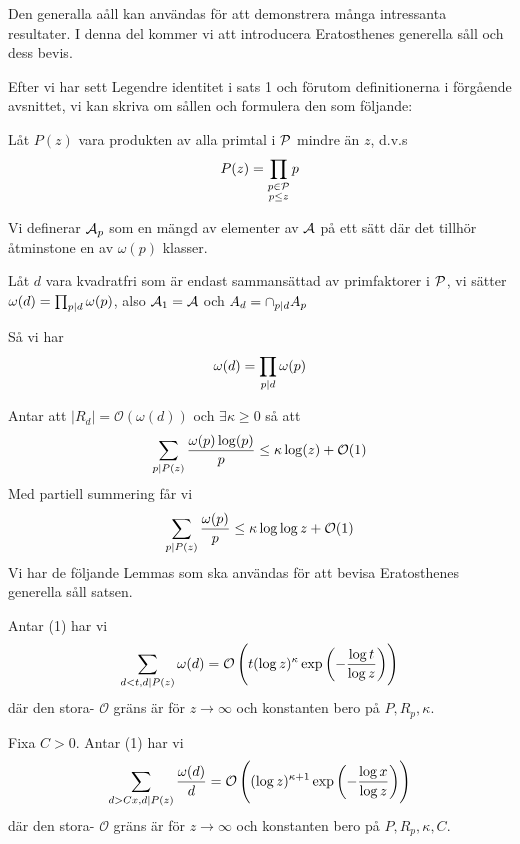 Den generalla aåll kan användas för att demonstrera många intressanta resultater. I denna del kommer vi att introducera Eratosthenes generella såll och dess bevis.

Efter vi har sett Legendre identitet i sats 1 och förutom definitionerna i förgående avsnittet, vi kan skriva om sållen och formulera den som följande:


Låt $ P(z) $ vara produkten av alla primtal i $ \P $ mindre än $ z $, d.v.s
\[P(z)=\prod_{\substack{p \in \P\\ p \leq z}} p \]

Vi definerar $\A_{p}$ som en mängd av elementer av $ \A $ på ett sätt där det tillhör åtminstone en av $\omega(p)$ klasser.

Låt $ d $ vara kvadratfri som är endast sammansättad av primfaktorer i $ \P $, vi sätter $\omega(d)=\prod_{p \divides d} \omega(p)$, also $\A_{1} =\A$ och $A_{d}=\cap_{p \divides d} A_{p}$

Så vi har
\[\omega(d)=\prod_{p\divides d}\omega(p)\]



Antar att $ \vert R_{d}\vert=\mathcal{O}(\omega(d))$ och $ \exists\kappa\geq 0 $ så att
\begin{equation}
\sum_{p\divides P(z)}\frac{\omega(p)\log(p)}{p}\leq \kappa \log(z)+\mathcal{O}(1)
\end{equation}  
Med partiell summering får vi
\[\sum_{p\divides P(z)}\frac{\omega(p)}{p}\leq\kappa\log\log z+\mathcal{O}(1)\]
   Vi har de följande Lemmas som ska användas för att bevisa Eratosthenes generella såll satsen.
\begin{lemma}
     Antar (1) har vi
$$
\sum_{d<t, d \divides P(z)} \omega(d)=\mathcal{O}\left(t(\log z)^{\kappa} \exp \left(-\frac{\log t}{\log z}\right)\right)
$$
där den stora- $\mathcal{O}$ gräns är för $z \rightarrow \infty$ och konstanten bero på $P, R_{p}, \kappa$.
\end{lemma}
\begin{lemma}
    Fixa $C>0 .$ Antar (1) har vi
$$
\sum_{d>C x, d \divides P(z)} \frac{\omega(d)}{d}=\mathcal{O}\left((\log z)^{\kappa+1} \exp \left(-\frac{\log x}{\log z}\right)\right)
$$
där den stora- $\mathcal{O}$ gräns är för $z \rightarrow \infty$ och konstanten bero på $P, R_{p}, \kappa, C .$
 
\end{lemma}

